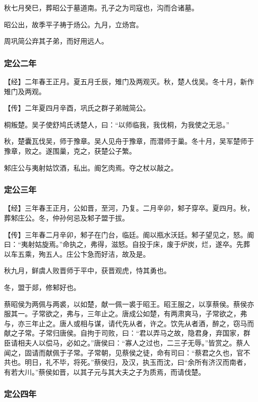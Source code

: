 \documentclass[]{article}
\begin{document}
秋七月癸巳，葬昭公于墓道南。孔子之为司寇也，沟而合诸墓。

昭公出，故季平子祷于炀公。九月，立炀宫。

周巩简公弃其子弟，而好用远人。

\hypertarget{header-n2887}{%
\subsubsection{定公二年}\label{header-n2887}}

【经】二年春王正月。夏五月壬辰，雉门及两观灭。秋，楚人伐吴。冬十月，新作雉门及两观。

【传】二年夏四月辛酉，巩氏之群子弟贼简公。

桐叛楚。吴子使舒鸠氏诱楚人，曰：``以师临我，我伐桐，为我使之无忌。''

秋，楚囊瓦伐吴，师于豫章。吴人见舟于豫章，而潜师于巢。冬十月，吴军楚师于豫章，败之。遂围巢，克之，获楚公子繁。

邾庄公与夷射姑饮酒，私出。阍乞肉焉。夺之杖以敲之。

\hypertarget{header-n2895}{%
\subsubsection{定公三年}\label{header-n2895}}

【经】三年春王正月，公如晋，至河，乃复。二月辛卯，邾子穿卒。夏四月。秋，葬邾庄公。冬，仲孙何忌及邾子盟于拔。

【传】三年春二月辛卯，邾子在门台，临廷。阍以瓶水沃廷。邾子望见之，怒。阍曰：``夷射姑旋焉。''命执之，弗得，滋怒。自投于床，废于炉炭，烂，遂卒。先葬以车五乘，殉五人。庄公卞急而好洁，故及是。

秋九月，鲜虞人败晋师于平中，获晋观虎，恃其勇也。

冬，盟于郯，修邾好也。

蔡昭侯为两佩与两裘，以如楚，献一佩一裘于昭王。昭王服之，以享蔡侯。蔡侯亦服其一。子常欲之，弗与，三年止之。唐成公如楚，有两肃爽马，子常欲之，弗与，亦三年止之。唐人或相与谋，请代先从者，许之。饮先从者酒，醉之，窃马而献之子常。子常归唐侯。自拘于司败，曰：``君以弄马之故，隐君身，弃国家，群臣请相夫人以偿马，必如之。''唐侯曰：``寡人之过也，二三子无辱。''皆赏之。蔡人闻之，固请而献佩于子常。子常朝，见蔡侯之徒，命有司曰：``蔡君之久也，官不共也。明日，礼不毕，将死。''蔡侯归，及汉，执玉而沈，曰``余所有济汉而南者，有若大川。''蔡侯如晋，以其子元与其大夫之子为质焉，而请伐楚。

\hypertarget{header-n2903}{%
\subsubsection{定公四年}\label{header-n2903}}
\end{document}
